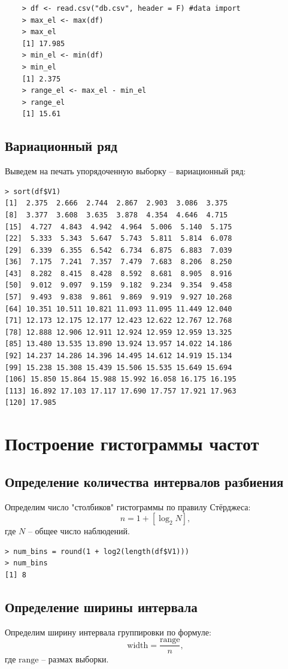 \documentclass[14pt,a4paper]{scrartcl}
\begin{document}
\begin{lstlisting}
	> df <- read.csv("db.csv", header = F) #data import
	> max_el <- max(df)
	> max_el
	[1] 17.985
	> min_el <- min(df)
	> min_el
	[1] 2.375
	> range_el <- max_el - min_el
	> range_el
	[1] 15.61
\end{lstlisting}
\subsection{Вариационный ряд}
Выведем на печать упорядоченную выборку -- вариационный ряд:
\begin{lstlisting}
> sort(df$V1)
[1]  2.375  2.666  2.744  2.867  2.903  3.086  3.375
[8]  3.377  3.608  3.635  3.878  4.354  4.646  4.715
[15]  4.727  4.843  4.942  4.964  5.006  5.140  5.175
[22]  5.333  5.343  5.647  5.743  5.811  5.814  6.078
[29]  6.339  6.355  6.542  6.734  6.875  6.883  7.039
[36]  7.175  7.241  7.357  7.479  7.683  8.206  8.250
[43]  8.282  8.415  8.428  8.592  8.681  8.905  8.916
[50]  9.012  9.097  9.159  9.182  9.234  9.354  9.458
[57]  9.493  9.838  9.861  9.869  9.919  9.927 10.268
[64] 10.351 10.511 10.821 11.093 11.095 11.449 12.040
[71] 12.173 12.175 12.177 12.423 12.622 12.767 12.768
[78] 12.888 12.906 12.911 12.924 12.959 12.959 13.325
[85] 13.480 13.535 13.890 13.924 13.957 14.022 14.186
[92] 14.237 14.286 14.396 14.495 14.612 14.919 15.134
[99] 15.238 15.308 15.439 15.506 15.535 15.649 15.694
[106] 15.850 15.864 15.988 15.992 16.058 16.175 16.195
[113] 16.892 17.103 17.117 17.690 17.757 17.921 17.963
[120] 17.985
\end{lstlisting}

\section{Построение гистограммы частот}
\subsection{Определение количества интервалов разбиения}
Определим число "столбиков" гистограммы по правилу Стёрджеса:
\begin{equation*}
	n = 1 + [\log_2{N}],
\end{equation*}
где $N$ -- общее число наблюдений.


\begin{lstlisting}
> num_bins = round(1 + log2(length(df$V1)))
> num_bins
[1] 8
\end{lstlisting}

\subsection{Определение ширины интервала}
Определим ширину интервала группировки по формуле:
\begin{equation*}
	\text{width} = \frac{\text{range}}{n},
\end{equation*}
где $\text{range}$ -- размах выборки.
\end{document}
